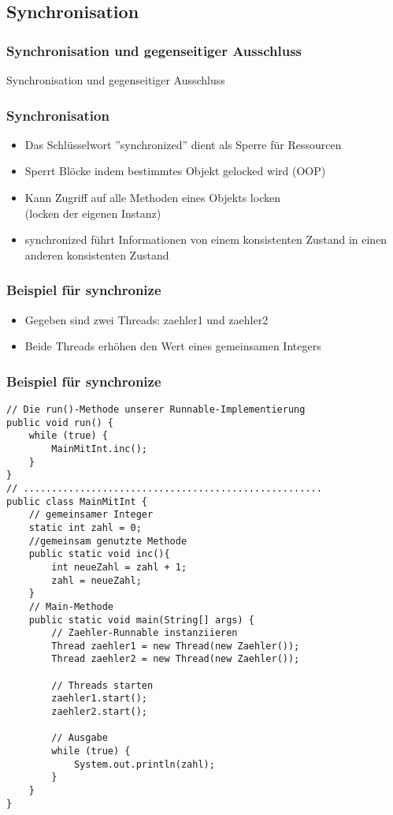 \subsection{Synchronisation}
\begin{frame}[fragile]
	\frametitle{Synchronisation und gegenseitiger Ausschluss}
	\huge Synchronisation und gegenseitiger Ausschluss
\end{frame}

\begin{frame}
\frametitle{Synchronisation}
	\begin{itemize}
		\item Das Schlüsselwort ''synchronized'' dient als Sperre für Ressourcen
		\item Sperrt Blöcke indem bestimmtes Objekt gelocked wird (OOP)
		\item Kann Zugriff auf alle Methoden eines Objekts locken \\
		(locken der eigenen Instanz)
		\item synchronized führt Informationen von einem konsistenten Zustand in einen
		anderen konsistenten Zustand
	\end{itemize}
\end{frame}

\begin{frame}[fragile]
\frametitle{Beispiel für synchronize}
	\begin{itemize}
	  \item Gegeben sind zwei Threads: zaehler1 und zaehler2
	  \item Beide Threads erhöhen den Wert eines gemeinsamen Integers
	\end{itemize}
\end{frame}

\begin{frame}[fragile]
\frametitle{Beispiel für synchronize}
\begin{lstlisting}
// Die run()-Methode unserer Runnable-Implementierung
public void run() {
	while (true) {
		MainMitInt.inc();
	}
}
// .....................................................
public class MainMitInt {
	// gemeinsamer Integer
    static int zahl = 0;
    //gemeinsam genutzte Methode
	public static void inc(){
		int neueZahl = zahl + 1;
	    zahl = neueZahl;
	}
	// Main-Methode
    public static void main(String[] args) {
		// Zaehler-Runnable instanziieren
		Thread zaehler1 = new Thread(new Zaehler());
		Thread zaehler2 = new Thread(new Zaehler());

		// Threads starten
		zaehler1.start();
		zaehler2.start();

		// Ausgabe
		while (true) {
		    System.out.println(zahl);
		}
    }
}
\end{lstlisting}
\end{frame}

